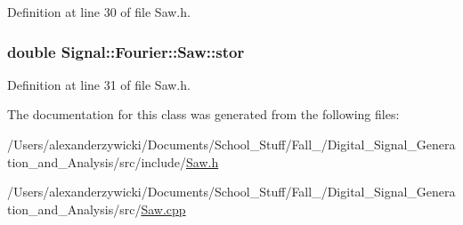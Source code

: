 Definition at line 30 of file Saw.\+h.

\hypertarget{classSignal_1_1Fourier_1_1Saw_a31859d02406add22e072936c33f386af}{
\subsubsection[{stor}]{\setlength{\rightskip}{0pt plus 5cm}double Signal\+::\+Fourier\+::\+Saw\+::stor\hspace{0.3cm}{\ttfamily [protected]}}}\label{classSignal_1_1Fourier_1_1Saw_a31859d02406add22e072936c33f386af}


Definition at line 31 of file Saw.\+h.



The documentation for this class was generated from the following files\+:\begin{DoxyCompactItemize}
\item 
/\+Users/alexanderzywicki/\+Documents/\+School\+\_\+\+Stuff/\+Fall\+\_/\+Digital\+\_\+\+Signal\+\_\+\+Generation\+\_\+and\+\_\+\+Analysis/src/include/\hyperlink{Saw_8h}{Saw.\+h}\item 
/\+Users/alexanderzywicki/\+Documents/\+School\+\_\+\+Stuff/\+Fall\+\_/\+Digital\+\_\+\+Signal\+\_\+\+Generation\+\_\+and\+\_\+\+Analysis/src/\hyperlink{Saw_8cpp}{Saw.\+cpp}\end{DoxyCompactItemize}
